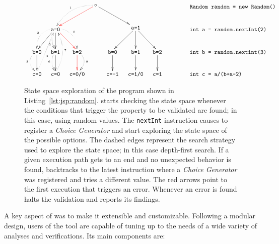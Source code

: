 \begin{figure}[t]
\centering
\[\xymatrix@C=1em{
	& & & \ar@[red][lld] \ar@/_1pc/@{.>}[lld]_{\txt{\tiny 1}} \circ \ar[rrd] & & & & \txt{\texttt{~~~~~~Random random = new Random()}} \\
	& \ar[ld] \ar@/_1pc/@{.>}[ld]_{\txt{\tiny 2}} \ar[d] \ar@/_/@{.>}[d]_(0.7){\txt{\tiny 5}} \txt{\texttt{a=0}} \ar@[red][rd] \ar@/^1pc/@{.>}[rd]^{\txt{\tiny 8}} & & & & 
	  \ar[ld] \ar[d] \texttt{a=1} \ar[rd] & & \txt{\texttt{~~~int a = random.nextInt(2)}} \\
	\ar[d] \ar@/_1pc/@{.>}[d]_{\txt{\tiny 3}} \txt{\texttt{b=0}} & 
	\ar[d] \ar@/_/@{.>}[d]_{\txt{\tiny 6}} \txt{\texttt{b=1}} & 
	\ar@[red][d] \ar@/^1pc/@{.>}[d]^{\txt{\tiny 9}} \txt{\texttt{b=2}} & & 
	\ar[d] \txt{\texttt{b=0}} & 
	\ar[d] \txt{\texttt{b=1}} & 
	\ar[d] \txt{\texttt{b=2}} & \txt{\texttt{~~~int b = random.nextint(3)}} \\
	\txt{\texttt{c=0}} \ar@{.>}[ruu]_(0.4){\txt{\tiny 4}} & 
	\ar@/_1pc/@{.>}[uu]_{\txt{\tiny 7}} \txt{\texttt{c=0}} & 
	\txt{\texttt{c=0/0}} & & 
	\txt{\texttt{c=-1}} & 
	\txt{\texttt{c=1/0}} & 
	\txt{\texttt{c=1}} & 
	\txt{\texttt{int c = a/(b+a-2)~~~~~~}}
} \]
\caption[State Space Exploration of an Example Program]{State space exploration of the program shown in Listing~\ref{lst:jsp:random}. \jpf{} starts checking the state space whenever the conditions that trigger the property to be validated are found; in this case, using random values. The \texttt{nextInt} instruction causes \jpf{} to register a \textit{Choice Generator} and start exploring the state space of the possible options. The dashed edges represent the search strategy used to explore the state space; in this case depth-first search. If a given execution path gets to an end and no unexpected behavior is found, \jpf{} backtracks to the latest instruction where a \textit{Choice Generator} was registered and tries a different value. The red arrows point to the first execution that triggers an error. Whenever an error is found \jpf{} halts the validation and reports its findings.}
\label{fig:jpf:random}
\end{figure}

A key aspect of \jpf{} was to make it extensible and customizable. Following a modular design, users of the tool are capable of tuning \jpf{} up to the needs of a wide variety of analyses and verifications. Its main components are:

